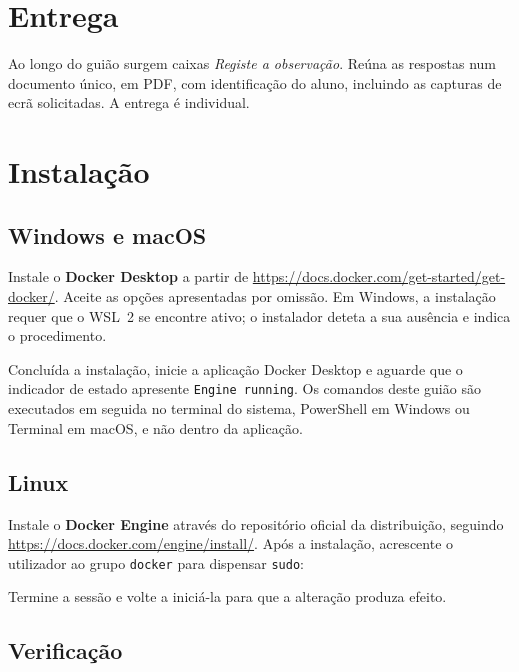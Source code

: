 \documentclass[11pt,a4paper]{article}
\begin{document}
\section*{Entrega}

Ao longo do guião surgem caixas \emph{Registe a observação}. Reúna as respostas num documento único, em PDF, com identificação do aluno, incluindo as capturas de ecrã solicitadas. A entrega é individual.

\clearpage

\section{Instalação}

\subsection{Windows e macOS}

Instale o \textbf{Docker Desktop} a partir de \url{https://docs.docker.com/get-started/get-docker/}. Aceite as opções apresentadas por omissão. Em Windows, a instalação requer que o WSL~2 se encontre ativo; o instalador deteta a sua ausência e indica o procedimento.

Concluída a instalação, inicie a aplicação Docker Desktop e aguarde que o indicador de estado apresente \texttt{Engine running}. Os comandos deste guião são executados em seguida no terminal do sistema, PowerShell em Windows ou Terminal em macOS, e não dentro da aplicação.

\subsection{Linux}

Instale o \textbf{Docker Engine} através do repositório oficial da distribuição, seguindo \url{https://docs.docker.com/engine/install/}. Após a instalação, acrescente o utilizador ao grupo \texttt{docker} para dispensar \texttt{sudo}:


Termine a sessão e volte a iniciá-la para que a alteração produza efeito.

\subsection{Verificação}
\end{document}
